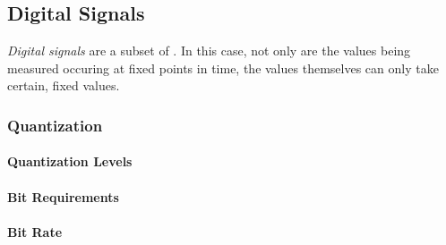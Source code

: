 \subsection{Digital Signals}\label{subsec:Digital Signals}
\begin{definition}\label{def:Digital Signals}
  \emph{Digital signals} are a subset of .
  In this case, not only are the values being measured occuring at fixed points in time, the values themselves can only take certain, fixed values.
\end{definition}

\subsubsection{Quantization}\label{subsubsec:Quantization}
\paragraph{Quantization Levels}\label{par:Quantization Levels}
\paragraph{Bit Requirements}\label{par:Quantization Bit Requirements}
\paragraph{Bit Rate}\label{par:Quantization Bit Rate}
